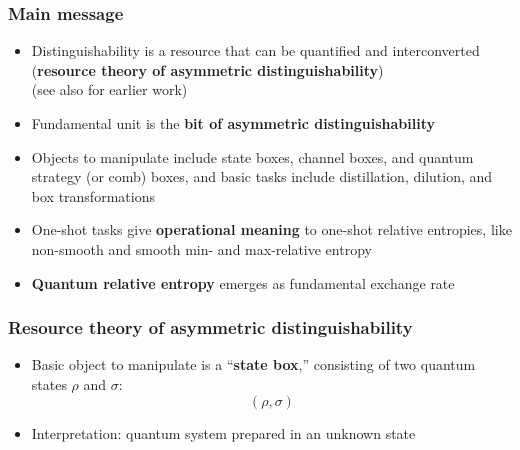 \documentclass[usenames,dvipsnames,handout]{beamer}
\begin{document}
\begin{frame}
\frametitle{Main message}

\begin{itemize}
\item<2-> Distinguishability is a resource that can be quantified and interconverted ({\color{MidnightBlue}\textbf{resource theory of asymmetric distinguishability}})\\(see also \cite{Mats10,M11} for earlier work)
\vspace{.1in}
\item<3-> Fundamental unit is the {\color{MidnightBlue}\textbf{bit of asymmetric distinguishability}}
\vspace{.1in}
\item<4-> Objects to manipulate include state boxes, channel boxes, and quantum strategy (or comb) boxes, and basic tasks include distillation, dilution, and box transformations
\vspace{.1in}
\item<5-> One-shot tasks give {\color{MidnightBlue}\textbf{operational meaning}} to one-shot relative entropies, like non-smooth and smooth min- and max-relative entropy
\vspace{.1in}
\item<6-> {\color{MidnightBlue}\textbf{Quantum relative entropy}} emerges as  fundamental exchange rate 
\end{itemize}


\end{frame}

\begin{frame}
\frametitle{Resource theory of asymmetric distinguishability}

\begin{itemize}

\pause
\item Basic object to manipulate is a ``{\color{MidnightBlue}\textbf{state box}},'' consisting of two quantum states $\rho$ and $\sigma$:
$$
(\rho, \sigma)
$$

\pause
\vspace{.1in}
\item Interpretation: quantum system  prepared in an unknown state


\end{itemize}

\end{frame}
\end{document}
